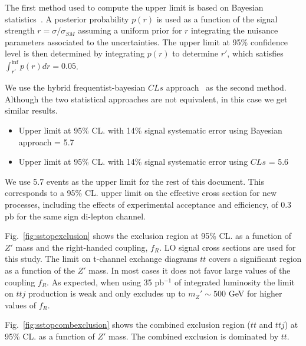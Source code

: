 The first method used to compute the upper limit is based on Bayesian statistics~\cite{bayesian}.
A posterior probability $p(r)$ is used as a function of the signal strength $r = \sigma/\sigma_{SM}$ 
assuming a uniform prior for $r$ integrating the nuisance parameters associated to the uncertainties.
The upper limit at 95\% confidence level is then determined by integrating $p(r)$ to determine $r'$, 
which satisfies $\int_{r'}^{\inf} p(r) dr = 0.05$.

We use the hybrid frequentist-bayesian $CLs$ approach~\cite{CLS} as the second method. 
Although the two statistical approaches are not equivalent, in this case we get similar results. 

\begin{itemize}
\item Upper limit at 95\% CL. with 14\% signal systematic error using Bayesian approach = 5.7  
\item Upper limit at 95\% CL. with 14\% signal systematic error using $CLs$ = 5.6  
\end{itemize}

We use 5.7 events as the upper limit for the rest of this document. 
This corresponds to a 95\% CL. upper limit on the effective cross section for new processes, 
including the effects of experimental acceptance and efficiency, of 0.3 pb for the same sign di-lepton channel.

Fig.~\ref{fig:sstopexclusion} shows the exclusion region at 95\% CL. as a function of $Z'$ mass and the right-handed coupling, $f_R$. 
LO signal cross sections are used for this study. 
The limit on t-channel exchange diagrams $tt$ covers a significant region as a function of the $Z'$ mass.
In most cases it does not favor large values of the coupling $f_R$. 
As expected, when using 35 pb$^{-1}$ of integrated luminosity the limit on $ttj$ production is weak and 
only excludes up to $m_Z' \sim 500$ GeV for higher values of $f_R$. 

Fig.~\ref{fig:sstopcombexclusion} shows the combined exclusion region ($tt$ and $ttj$) at 
95\% CL. as a function of $Z'$ mass.  The combined exclusion is dominated by $tt$.

